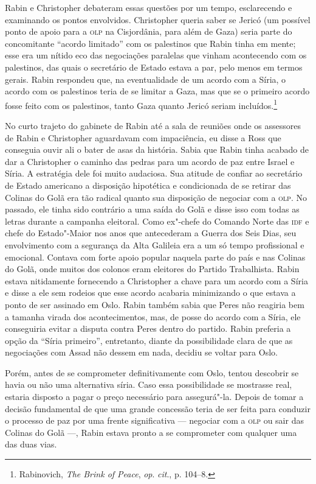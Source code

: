 Rabin e Christopher debateram essas questões por um tempo, esclarecendo
e examinando os pontos envolvidos. Christopher queria saber se Jericó
(um possível ponto de apoio para a \textsc{olp} na Cisjordânia, para além de
Gaza) seria parte do concomitante ``acordo limitado'' com os palestinos
que Rabin tinha em mente; esse era um nítido eco das negociações
paralelas que vinham acontecendo com os palestinos, das quais o
secretário de Estado estava a par, pelo menos em termos gerais. Rabin
respondeu que, na eventualidade de um acordo com a Síria, o acordo com os
palestinos teria de se limitar a Gaza, mas que se o primeiro acordo
fosse feito com os palestinos, tanto Gaza quanto Jericó seriam
incluídos.\footnote{Rabinovich, \textit{The Brink of Peace}, \textit{op}.
\textit{cit}., p. 104--8.}

No curto trajeto do gabinete de Rabin até a sala de reuniões onde os
assessores de Rabin e Christopher aguardavam com impaciência, eu disse a
Ross que conseguia ouvir ali o bater de asas da história. Sabia que
Rabin tinha acabado de dar a Christopher o caminho das pedras para um
acordo de paz entre Israel e Síria. A estratégia dele foi muito
audaciosa. Sua atitude de confiar ao secretário de Estado americano a
disposição hipotética e condicionada de se retirar das Colinas do Golã
era tão radical quanto sua disposição de negociar com a \textsc{olp}. No passado,
ele tinha sido contrário a uma saída do Golã e disse isso com todas as
letras durante a campanha eleitoral. Como ex"-chefe do Comando Norte
das \textsc{idf} e chefe do Estado"-Maior nos anos que antecederam a Guerra dos
Seis Dias, seu envolvimento com a segurança da Alta Galileia era a um só
tempo profissional e emocional. Contava com forte apoio popular naquela
parte do país e nas Colinas do Golã, onde muitos dos colonos eram
eleitores do Partido Trabalhista. Rabin estava nitidamente fornecendo a
Christopher a chave para um acordo com a Síria e disse a ele sem rodeios
que esse acordo acabaria minimizando o que estava a ponto de ser
assinado em Oslo. Rabin também sabia que Peres não reagiria bem a
tamanha virada dos acontecimentos, mas, de posse do acordo com a Síria,
ele conseguiria evitar a disputa contra Peres dentro do partido. Rabin
preferia a opção da ``Síria primeiro'', entretanto, diante da possibilidade
clara de que as negociações com Assad não dessem em nada, decidiu se
voltar para Oslo.

Porém, antes de se comprometer definitivamente com Oslo, tentou
descobrir se havia ou não uma alternativa síria. Caso essa possibilidade
se mostrasse real, estaria disposto a pagar o preço necessário para
assegurá"-la. Depois de tomar a decisão fundamental de que uma grande
concessão teria de ser feita para conduzir o processo de paz por uma
frente significativa --- negociar com a \textsc{olp} ou sair das Colinas do Golã
---, Rabin estava pronto a se comprometer com qualquer uma das duas vias.

